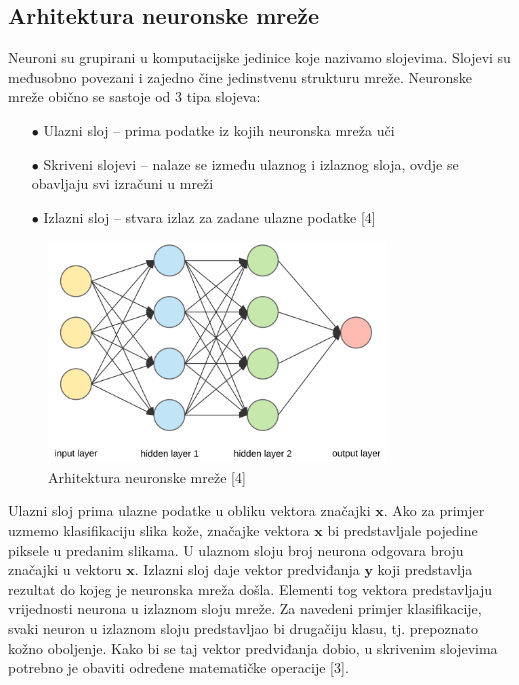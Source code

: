 \documentclass[times, utf8, zavrsni]{fer}
\begin{document}
\newpage
\subsection*{Arhitektura neuronske mreže}

\indent{}
Neuroni su grupirani u komputacijske jedinice koje nazivamo slojevima. Slojevi su međusobno povezani i zajedno čine jedinstvenu strukturu mreže. Neuronske mreže obično se sastoje od $3$ tipa slojeva:
\begin{itemize}
\item[$\bullet$] Ulazni sloj -- prima podatke iz kojih neuronska mreža uči
\item[$\bullet$] Skriveni slojevi -- nalaze se između ulaznog i izlaznog sloja, ovdje se obavljaju svi izračuni u mreži
\item[$\bullet$] Izlazni sloj -- stvara izlaz za zadane ulazne podatke [4]
\end{itemize} 
%
\begin{figure}[!h]
\centering
\includegraphics[width=0.8\textwidth]{./slike/net-arch}
\caption{Arhitektura neuronske mreže [4]}
\label{fig:mreza-arh}
\end{figure}
%
Ulazni sloj prima ulazne podatke u obliku vektora značajki $\mathbf{x}$. Ako za primjer uzmemo klasifikaciju slika kože, značajke vektora $\mathbf{x}$ bi predstavljale pojedine piksele u predanim slikama. U ulaznom sloju broj neurona odgovara broju značajki u vektoru $\mathbf{x}$. Izlazni sloj daje vektor predviđanja $\mathbf{y}$ koji predstavlja rezultat do kojeg je neuronska mreža došla. Elementi tog vektora predstavljaju vrijednosti neurona u izlaznom sloju mreže. Za navedeni primjer klasifikacije, svaki neuron u izlaznom sloju predstavljao bi drugačiju klasu, tj. prepoznato kožno oboljenje. Kako bi se taj vektor predviđanja dobio, u skrivenim slojevima potrebno je obaviti određene matematičke operacije [3].
\newpage
\end{document}
